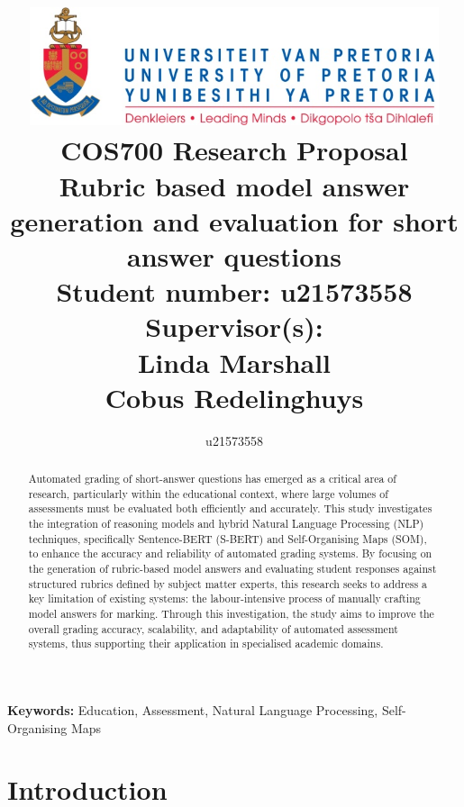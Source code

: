 \documentclass[a4paper,10pt]{article}
\title
{
   \includegraphics[width=12cm]{up_logo.png} \\
   \vspace{2cm}
   \textbf{COS700 Research Proposal} \\ \vspace{0.5cm}
   Rubric based model answer generation and evaluation for short
answer questions \\ \vspace{0.5cm}
   \textbf{Student number:} u21573558 \\ \vspace{0.5cm}
   \textbf{Supervisor(s)}: \\ Linda Marshall \\ Cobus Redelinghuys 
}
\begin{document}
\author{u21573558}
\linespread{1.25}
\maketitle

\newpage
\begin{abstract}
Automated grading of short-answer questions has emerged as a critical area of research, particularly within the educational context, where large volumes of assessments must be evaluated both efficiently and accurately. This study investigates the integration of reasoning models and hybrid Natural Language Processing (NLP) techniques, specifically Sentence-BERT (S-BERT) and Self-Organising Maps (SOM), to enhance the accuracy and reliability of automated grading systems. By focusing on the generation of rubric-based model answers and evaluating student responses against structured rubrics defined by subject matter experts, this research seeks to address a key limitation of existing systems: the labour-intensive process of manually crafting model answers for marking. Through this investigation, the study aims to improve the overall grading accuracy, scalability, and adaptability of automated assessment systems, thus supporting their application in specialised academic domains.
\end{abstract}

\noindent \textbf{Keywords:} Education, Assessment, Natural Language Processing, Self-Organising Maps

\section{Introduction}
\end{document}
